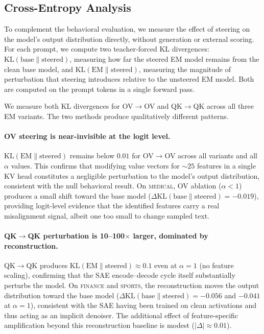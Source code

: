 \documentclass{article}
\theoremstyle{plain}
\theoremstyle{definition}
\theoremstyle{remark}
\begin{document}
\subsection{Cross-Entropy Analysis}\label{app:ce_analysis}

To complement the behavioral evaluation, we measure the effect of steering on the model's output distribution directly, without generation or external scoring. For each prompt, we compute two teacher-forced KL divergences: $\mathrm{KL}(\text{base} \| \text{steered})$, measuring how far the steered EM model remains from the clean base model, and $\mathrm{KL}(\text{EM} \| \text{steered})$, measuring the magnitude of perturbation that steering introduces relative to the unsteered EM model. Both are computed on the prompt tokens in a single forward pass.

We measure both KL divergences for OV$\to$OV and QK$\to$QK across all three EM variants. The two methods produce qualitatively different patterns.

\paragraph{OV steering is near-invisible at the logit level.} $\mathrm{KL}(\text{EM} \| \text{steered})$ remains below $0.01$ for OV$\to$OV across all variants and all $\alpha$ values. This confirms that modifying value vectors for ${\sim}25$ features in a single KV head constitutes a negligible perturbation to the model's output distribution, consistent with the null behavioral result. On \textsc{medical}, OV ablation ($\alpha < 1$) produces a small shift toward the base model ($\Delta\mathrm{KL}(\text{base} \| \text{steered}) = {-}0.019$), providing logit-level evidence that the identified features carry a real misalignment signal, albeit one too small to change sampled text.

\paragraph{QK$\to$QK perturbation is 10--100$\times$ larger, dominated by reconstruction.} QK$\to$QK produces $\mathrm{KL}(\text{EM} \| \text{steered}) \approx 0.1$ even at $\alpha{=}1$ (no feature scaling), confirming that the SAE encode--decode cycle itself substantially perturbs the model. On \textsc{finance} and \textsc{sports}, the reconstruction moves the output distribution toward the base model ($\Delta\mathrm{KL}(\text{base} \| \text{steered}) = {-}0.056$ and ${-}0.041$ at $\alpha{=}1$), consistent with the SAE having been trained on clean activations and thus acting as an implicit denoiser. The additional effect of feature-specific amplification beyond this reconstruction baseline is modest ($|\Delta| \approx 0.01$).
\end{document}
